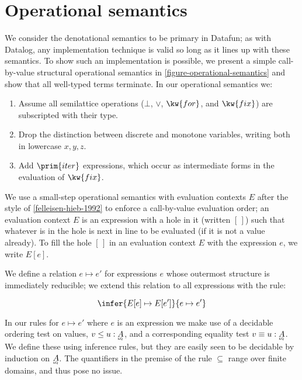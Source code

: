\section{Operational semantics}

\newcommand\emptyhole{[\,]}



We consider the denotational semantics to be primary in Datafun; as with
Datalog, any implementation technique is valid so long as it lines up with these
semantics.
%
To show such an implementation is possible, we present a simple call-by-value
structural operational semantics in \cref{figure-operational-semantics} and show
that all well-typed terms terminate.
%
In our operational semantics we:

\begin{enumerate}
\item Assume all semilattice operations ($\bot$, $\vee$, $\kw{for}$, and
  $\kw{fix}$) are subscripted with their type.
\item Drop the distinction between discrete and monotone variables, writing both
  in lowercase $x,y,z$.
\item Add $\prim{iter}$ expressions, which occur as intermediate forms in the
  evaluation of $\kw{fix}$.
\end{enumerate}

\noindent
We use a small-step operational semantics with evaluation contexts $E$ after
the style of \cref{felleisen-hieb-1992} to enforce a call-by-value evaluation
order; an evaluation context $E$ is an expression with a hole in it (written
$\emptyhole$) such that whatever is in the hole is next in line to be evaluated
(if it is not a value already). To fill the hole $\emptyhole$ in an evaluation
context $E$ with the expression $e$, we write $E[e]$.

\newcommand\stepsto\mapsto

We define a relation $e \stepsto e'$ for expressions $e$ whose outermost
structure is immediately reducible; we extend this relation to all
expressions with the rule:

\[
\infer{E[e]\stepsto E[e']}{e\stepsto e'}
\]

\noindent
In our rules for $e \stepsto e'$ where $e$ is an  expression we make
use of a decidable ordering test on values, $v \le u : \eqt A$, and a
corresponding equality test $v \equiv u : \eqt A$. We define these using
inference rules, but they are easily seen to be decidable by induction on $\eqt
A$. The quantifiers in the premise of the rule $\subseteq$ range over finite
domains, and thus pose no issue.
